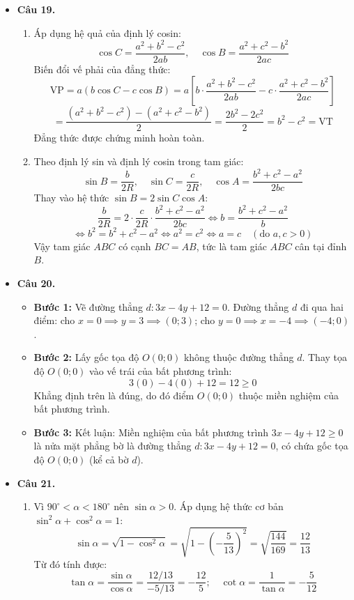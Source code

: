 \documentclass[12pt,a4paper]{article}
\begin{document}
\begin{itemize}[leftmargin=0.6cm, itemsep=4pt]
\item \textbf{Câu 19.}
\begin{enumerate}
    \item Áp dụng hệ quả của định lý cosin:
    $$\cos C = \dfrac{a^2 + b^2 - c^2}{2ab},\quad \cos B = \dfrac{a^2 + c^2 - b^2}{2ac}$$
    Biến đổi vế phải của đẳng thức:
    $$\text{VP} = a(b\cos C - c\cos B) = a \left[ b \cdot \dfrac{a^2 + b^2 - c^2}{2ab} - c \cdot \dfrac{a^2 + c^2 - b^2}{2ac} \right]$$
    $$= \dfrac{(a^2 + b^2 - c^2) - (a^2 + c^2 - b^2)}{2} = \dfrac{2b^2 - 2c^2}{2} = b^2 - c^2 = \text{VT}$$
    Đẳng thức được chứng minh hoàn toàn.

    \item Theo định lý sin và định lý cosin trong tam giác:
    $$\sin B = \dfrac{b}{2R},\quad \sin C = \dfrac{c}{2R},\quad \cos A = \dfrac{b^2 + c^2 - a^2}{2bc}$$
    Thay vào hệ thức $\sin B = 2\sin C \cos A$:
    $$\dfrac{b}{2R} = 2 \cdot \dfrac{c}{2R} \cdot \dfrac{b^2 + c^2 - a^2}{2bc} \iff b = \dfrac{b^2 + c^2 - a^2}{b}$$
    $$\iff b^2 = b^2 + c^2 - a^2 \iff a^2 = c^2 \iff a = c \quad (\text{do } a, c > 0)$$
    Vậy tam giác $ABC$ có cạnh $BC = AB$, tức là tam giác $ABC$ cân tại đỉnh $B$.
\end{enumerate}

\item \textbf{Câu 20.}
\begin{itemize}
    \item \textbf{Bước 1:} Vẽ đường thẳng $d: 3x - 4y + 12 = 0$.
    Đường thẳng $d$ đi qua hai điểm: cho $x = 0 \implies y = 3 \implies (0; 3)$; cho $y = 0 \implies x = -4 \implies (-4; 0)$.
    \item \textbf{Bước 2:} Lấy gốc tọa độ $O(0; 0)$ không thuộc đường thẳng $d$.
    Thay tọa độ $O(0; 0)$ vào vế trái của bất phương trình:
    $$3(0) - 4(0) + 12 = 12 \ge 0$$
    Khẳng định trên là đúng, do đó điểm $O(0; 0)$ thuộc miền nghiệm của bất phương trình.
    \item \textbf{Bước 3:} Kết luận: Miền nghiệm của bất phương trình $3x - 4y + 12 \ge 0$ là nửa mặt phẳng bờ là đường thẳng $d: 3x - 4y + 12 = 0$, có chứa gốc tọa độ $O(0; 0)$ (kể cả bờ $d$).
\end{itemize}

\item \textbf{Câu 21.}
\begin{enumerate}
    \item Vì $90^\circ < \alpha < 180^\circ$ nên $\sin \alpha > 0$.
    Áp dụng hệ thức cơ bản $\sin^2\alpha + \cos^2\alpha = 1$:
    $$\sin \alpha = \sqrt{1 - \cos^2\alpha} = \sqrt{1 - \left(-\dfrac{5}{13}\right)^2} = \sqrt{\dfrac{144}{169}} = \dfrac{12}{13}$$
    Từ đó tính được:
    $$\tan \alpha = \dfrac{\sin \alpha}{\cos \alpha} = \dfrac{12/13}{-5/13} = -\dfrac{12}{5};\quad \cot \alpha = \dfrac{1}{\tan \alpha} = -\dfrac{5}{12}$$


\end{enumerate}
\end{itemize}
\end{document}
